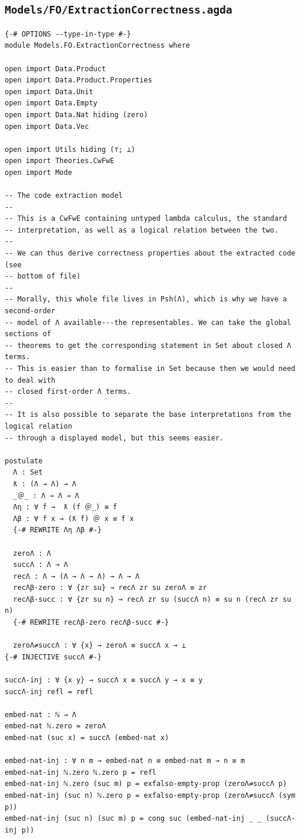 \subsection*{\texttt{Models/FO/ExtractionCorrectness.agda}}
{\agdafont\begin{Verbatim}[breaklines=true,breakanywhere=true,fontsize=\scriptsize]
{-# OPTIONS --type-in-type #-}
module Models.FO.ExtractionCorrectness where

open import Data.Product
open import Data.Product.Properties
open import Data.Unit
open import Data.Empty
open import Data.Nat hiding (zero)
open import Data.Vec

open import Utils hiding (⊤; ⊥)
open import Theories.CwFwE
open import Mode

-- The code extraction model
--
-- This is a CwFwE containing untyped lambda calculus, the standard
-- interpretation, as well as a logical relation between the two.
--
-- We can thus derive correctness properties about the extracted code (see
-- bottom of file)
--
-- Morally, this whole file lives in Psh(Λ), which is why we have a second-order
-- model of Λ available---the representables. We can take the global sections of
-- theorems to get the corresponding statement in Set about closed Λ terms.
-- This is easier than to formalise in Set because then we would need to deal with
-- closed first-order Λ terms.
--
-- It is also possible to separate the base interpretations from the logical relation
-- through a displayed model, but this seems easier.

postulate
  Λ : Set
  ƛ : (Λ → Λ) → Λ
  _＠_ : Λ → Λ → Λ
  Λη : ∀ f →  ƛ (f ＠_) ≡ f
  Λβ : ∀ f x → (ƛ f) ＠ x ≡ f x
  {-# REWRITE Λη Λβ #-}

  zeroΛ : Λ
  succΛ : Λ → Λ
  recΛ : Λ → (Λ → Λ → Λ) → Λ → Λ
  recΛβ-zero : ∀ {zr su} → recΛ zr su zeroΛ ≡ zr
  recΛβ-succ : ∀ {zr su n} → recΛ zr su (succΛ n) ≡ su n (recΛ zr su n)
  {-# REWRITE recΛβ-zero recΛβ-succ #-}

  zeroΛ≠succΛ : ∀ {x} → zeroΛ ≡ succΛ x → ⊥
{-# INJECTIVE succΛ #-}

succΛ-inj : ∀ {x y} → succΛ x ≡ succΛ y → x ≡ y
succΛ-inj refl = refl

embed-nat : ℕ → Λ
embed-nat ℕ.zero = zeroΛ
embed-nat (suc x) = succΛ (embed-nat x)

embed-nat-inj : ∀ n m → embed-nat n ≡ embed-nat m → n ≡ m
embed-nat-inj ℕ.zero ℕ.zero p = refl
embed-nat-inj ℕ.zero (suc m) p = exfalso-empty-prop (zeroΛ≠succΛ p)
embed-nat-inj (suc n) ℕ.zero p = exfalso-empty-prop (zeroΛ≠succΛ (sym p))
embed-nat-inj (suc n) (suc m) p = cong suc (embed-nat-inj _ _ (succΛ-inj p))


\end{Verbatim}}
